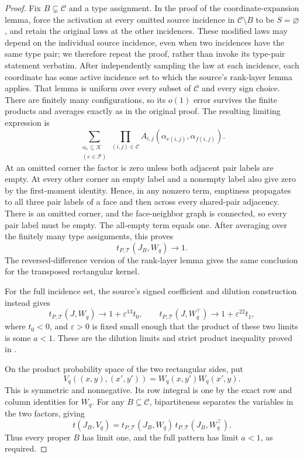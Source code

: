 \documentclass[a4paper,11pt,reqno]{amsart}
\theoremstyle{plain}
\theoremstyle{definition}
\theoremstyle{remark}
\begin{document}
\begin{proof}
Fix $B\subsetneq\mathscr C$ and a type assignment.
In the proof of the coordinate-expansion lemma, force the activation
at every omitted source incidence in $\mathscr C\setminus B$ to be
$S=\varnothing$, and retain the original laws at the other incidences.
These modified laws may depend on the individual source incidence,
even when two incidences have the same type pair; we therefore repeat
the proof, rather than invoke its type-pair statement verbatim.
After independently sampling the law at each incidence, each
coordinate has some active incidence set to which the source's
rank-layer lemma applies.  That lemma is uniform over every subset
of $\mathscr C$ and every sign choice.  There are finitely many
configurations, so its $o(1)$ error survives the finite products and
averages exactly as in the original proof.
The resulting limiting expression is
\[
 \sum_{\substack{\alpha_e\subseteq\mathcal K\\(e\in\mathcal P)}}
       \prod_{(i,j)\in\mathscr C}
       A_{i,j}(\alpha_{e(i,j)},\alpha_{f(i,j)}).
\]
At an omitted corner the factor is zero unless both adjacent pair
labels are empty.  At every other corner an empty label and a
nonempty label also give zero by the first-moment identity.
Hence, in any nonzero term, emptiness propagates to all three pair
labels of a face and then across every shared-pair adjacency.
There is an omitted corner, and the face-neighbor graph is
connected, so every pair label must be empty.
The all-empty term equals one.
After averaging over the finitely many type assignments, this proves
\[
 t_{P,\mathcal T}(J_B,W_q)\longrightarrow1.
 \]
The reversed-difference version of the rank-layer lemma gives the
same conclusion for the transposed rectangular kernel.

For the full incidence set, the source's signed coefficient and
dilution construction instead gives
\[
 t_{P,\mathcal T}(J,W_q)\longrightarrow
    1+\varepsilon^{13}t_0,\qquad
 t_{P,\mathcal T}(J,W_q^\top)\longrightarrow
    1+\varepsilon^{22}t_1,
\]
where $t_0<0$, and $\varepsilon>0$ is fixed small enough that the
product of these two limits is some $a<1$.
These are the dilution limits and strict product inequality
proved in \citep[Section~3]{openai161}.

On the product probability space of the two rectangular sides, put
\[
 V_q((x,y),(x',y'))=W_q(x,y')W_q(x',y).
\]
This is symmetric and nonnegative.  Its row integral is one by the
exact row and column identities for $W_q$.
For any $B\subseteq\mathscr C$, bipartiteness separates the variables
in the two factors, giving
\[
 t(J_B,V_q)=
 t_{P,\mathcal T}(J_B,W_q)\,
 t_{P,\mathcal T}(J_B,W_q^\top).
\]
Thus every proper $B$ has limit one, and the full pattern has limit
$a<1$, as required.
\end{proof}
\end{document}
